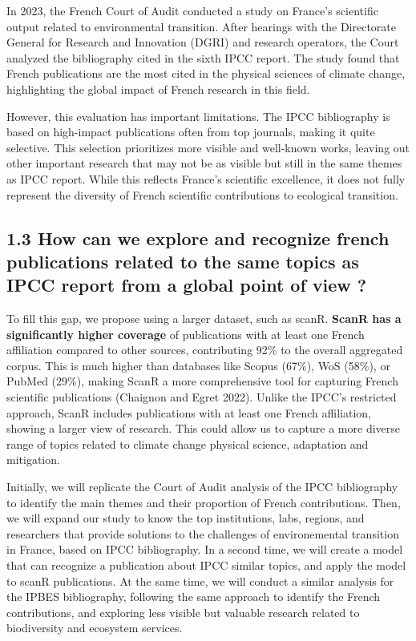 \documentclass[
]{article}
\begin{document}
In 2023, the French Court of Audit conducted a study on France's
scientific output related to environmental transition. After hearings
with the Directorate General for Research and Innovation (DGRI) and
research operators, the Court analyzed the bibliography cited in the
sixth IPCC report. The study found that French publications are the most
cited in the physical sciences of climate change, highlighting the
global impact of French research in this field.

However, this evaluation has important limitations. The IPCC
bibliography is based on high-impact publications often from top
journals, making it quite selective. This selection prioritizes more
visible and well-known works, leaving out other important research that
may not be as visible but still in the same themes as IPCC report. While
this reflects France's scientific excellence, it does not fully
represent the diversity of French scientific contributions to ecological
transition.

\hypertarget{how-can-we-explore-and-recognize-french-publications-related-to-the-same-topics-as-ipcc-report-from-a-global-point-of-view}{%
\subsection{1.3 How can we explore and recognize french publications
related to the same topics as IPCC report from a global point of view
?}\label{how-can-we-explore-and-recognize-french-publications-related-to-the-same-topics-as-ipcc-report-from-a-global-point-of-view}}

To fill this gap, we propose using a larger dataset, such as scanR.
\textbf{ScanR has a significantly higher coverage} of publications with
at least one French affiliation compared to other sources, contributing
92\% to the overall aggregated corpus. This is much higher than
databases like Scopus (67\%), WoS (58\%), or PubMed (29\%), making ScanR
a more comprehensive tool for capturing French scientific publications
(Chaignon and Egret 2022). Unlike the IPCC's restricted approach, ScanR
includes publications with at least one French affiliation, showing a
larger view of research. This could allow us to capture a more diverse
range of topics related to climate change physical science, adaptation
and mitigation.

Initially, we will replicate the Court of Audit analysis of the IPCC
bibliography to identify the main themes and their proportion of French
contributions. Then, we will expand our study to know the top
institutions, labs, regions, and researchers that provide solutions to
the challenges of environemental transition in France, based on IPCC
bibliography. In a second time, we will create a model that can
recognize a publication about IPCC similar topics, and apply the model
to scanR publications. At the same time, we will conduct a similar
analysis for the IPBES bibliography, following the same approach to
identify the French contributions, and exploring less visible but
valuable research related to biodiversity and ecosystem services.
\end{document}
